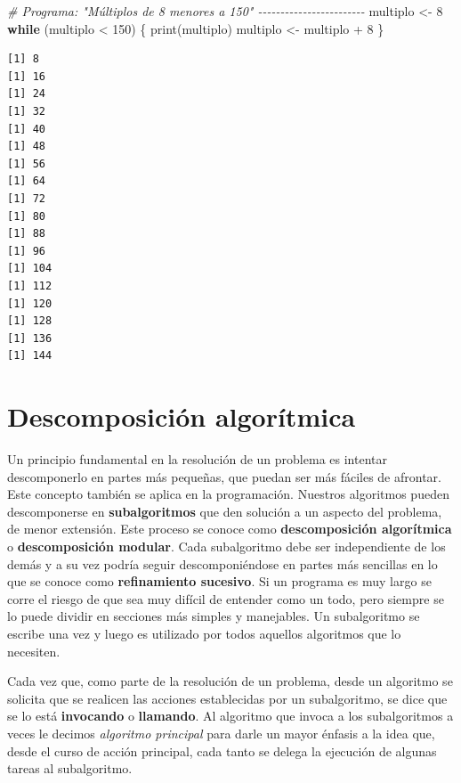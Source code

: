 \documentclass[
]{book}
\newenvironment{Shaded}{\begin{snugshade}}{\end{snugshade}}
\newcommand{\CommentTok}[1]{\textcolor[rgb]{0.56,0.35,0.01}{\textit{#1}}}
\newcommand{\ControlFlowTok}[1]{\textcolor[rgb]{0.13,0.29,0.53}{\textbf{#1}}}
\newcommand{\DecValTok}[1]{\textcolor[rgb]{0.00,0.00,0.81}{#1}}
\newcommand{\FunctionTok}[1]{\textcolor[rgb]{0.00,0.00,0.00}{#1}}
\newcommand{\NormalTok}[1]{#1}
\newcommand{\OtherTok}[1]{\textcolor[rgb]{0.56,0.35,0.01}{#1}}
\newcommand{\SpecialCharTok}[1]{\textcolor[rgb]{0.00,0.00,0.00}{#1}}
\begin{document}
\begin{itemize}
\begin{Shaded}
\begin{Highlighting}[]
\CommentTok{\# Programa: "Múltiplos de 8 menores a 150" {-}{-}{-}{-}{-}{-}{-}{-}{-}{-}{-}{-}{-}{-}{-}{-}{-}{-}{-}{-}{-}{-}{-}{-}}
\NormalTok{multiplo }\OtherTok{\textless{}{-}} \DecValTok{8}
\ControlFlowTok{while}\NormalTok{ (multiplo }\SpecialCharTok{\textless{}} \DecValTok{150}\NormalTok{) \{}
    \FunctionTok{print}\NormalTok{(multiplo)}
\NormalTok{    multiplo }\OtherTok{\textless{}{-}}\NormalTok{ multiplo }\SpecialCharTok{+} \DecValTok{8}
\NormalTok{\}}
\end{Highlighting}
\end{Shaded}

\begin{verbatim}
[1] 8
[1] 16
[1] 24
[1] 32
[1] 40
[1] 48
[1] 56
[1] 64
[1] 72
[1] 80
[1] 88
[1] 96
[1] 104
[1] 112
[1] 120
[1] 128
[1] 136
[1] 144
\end{verbatim}
\end{itemize}

\hypertarget{descomposiciuxf3n-algoruxedtmica}{%
\chapter{Descomposición algorítmica}\label{descomposiciuxf3n-algoruxedtmica}}

Un principio fundamental en la resolución de un problema es intentar descomponerlo en partes más pequeñas, que puedan ser más fáciles de afrontar. Este concepto también se aplica en la programación. Nuestros algoritmos pueden descomponerse en \textbf{subalgoritmos} que den solución a un aspecto del problema, de menor extensión. Este proceso se conoce como \textbf{descomposición algorítmica} o \textbf{descomposición modular}. Cada subalgoritmo debe ser independiente de los demás y a su vez podría seguir descomponiéndose en partes más sencillas en lo que se conoce como \textbf{refinamiento sucesivo}. Si un programa es muy largo se corre el riesgo de que sea muy difícil de entender como un todo, pero siempre se lo puede dividir en secciones más simples y manejables. Un subalgoritmo se escribe una vez y luego es utilizado por todos aquellos algoritmos que lo necesiten.

Cada vez que, como parte de la resolución de un problema, desde un algoritmo se solicita que se realicen las acciones establecidas por un subalgoritmo, se dice que se lo está \textbf{invocando} o \textbf{llamando}. Al algoritmo que invoca a los subalgoritmos a veces le decimos \emph{algoritmo principal} para darle un mayor énfasis a la idea que, desde el curso de acción principal, cada tanto se delega la ejecución de algunas tareas al subalgoritmo.
\end{document}
